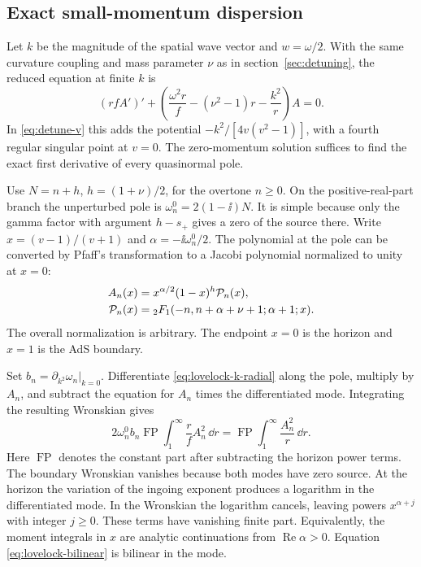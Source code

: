 \subsection{Exact small-momentum dispersion}
\label{sec:lovelock-momentum}

Let \(k\) be the magnitude of the spatial wave vector and
\(w=\omega/2\). With the same curvature coupling and mass
parameter \(\nu\) as in section~\ref{sec:detuning}, the reduced
equation at finite \(k\) is
\begin{equation}
 (rfA')'+\left(\frac{\omega^2 r}{f}
      -(\nu^2-1)r-\frac{k^2}{r}\right)A=0 .
 \label{eq:lovelock-k-radial}
\end{equation}
In \eqref{eq:detune-v} this adds the potential
\(-k^2/[4v(v^2-1)]\), with a fourth regular singular point at
\(v=0\). The zero-momentum solution suffices to find the exact
first derivative of every quasinormal pole.

Use \(N=n+h\), \(h=(1+\nu)/2\), for the overtone \(n\geq0\).
On the positive-real-part branch the unperturbed pole is
\(\omega_n^0=2(1-\ii)N\). It is simple because only the gamma
factor with argument \(h-s_+\) gives a zero of the source there.
Write \(x=(v-1)/(v+1)\) and \(\alpha=-\ii\omega_n^0/2\).
The polynomial at the pole can be converted by Pfaff's transformation
to a Jacobi polynomial normalized to unity at \(x=0\):
\begin{align}
 A_n(x)&=x^{\alpha/2}(1-x)^h \mathcal P_n(x),\notag\\
 \mathcal P_n(x)&={}_2F_1(-n,n+\alpha+\nu+1;\alpha+1;x).
 \label{eq:lovelock-jacobi-mode}
\end{align}
The overall normalization is arbitrary. The endpoint \(x=0\)
is the horizon and \(x=1\) is the AdS boundary.

Set \(b_n=\partial_{k^2}\omega_n|_{k=0}\). Differentiate
\eqref{eq:lovelock-k-radial} along the pole, multiply by
\(A_n\), and subtract the equation for \(A_n\) times the
differentiated mode. Integrating the resulting Wronskian gives
\begin{equation}
 2\omega_n^0 b_n \operatorname{FP}\!\int_1^\infty
      \frac{r}{f}A_n^2\,\dd r
   =\operatorname{FP}\!\int_1^\infty \frac{A_n^2}{r}\,\dd r .
 \label{eq:lovelock-bilinear}
\end{equation}
Here \(\operatorname{FP}\) denotes the constant part after subtracting
the horizon power terms. The boundary Wronskian vanishes because
both modes have zero source. At the horizon the variation of the
ingoing exponent produces a logarithm in the differentiated mode.
In the Wronskian the logarithm cancels, leaving powers
\(x^{\alpha+j}\) with integer \(j\geq0\). These terms have vanishing
finite part. Equivalently, the moment integrals in \(x\) are analytic
continuations from \(\operatorname{Re}\alpha>0\). Equation
\eqref{eq:lovelock-bilinear} is bilinear in the mode.

